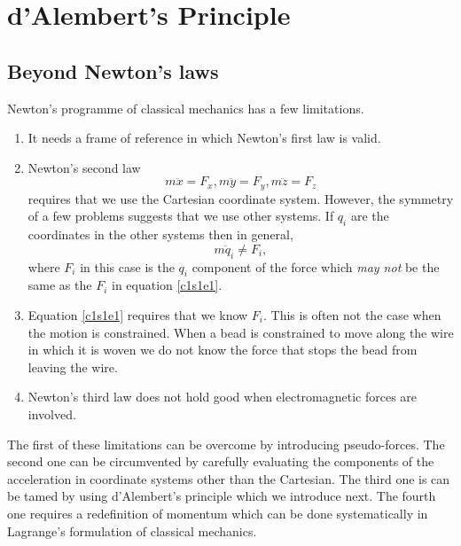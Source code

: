 \chapter{d'Alembert's Principle}\label{c1}
\section{Beyond Newton's laws}\label{c1s1}
Newton's programme of classical mechanics has a few limitations.
\begin{enumerate}
\item It needs a frame of reference in which Newton's first law is valid.
\item Newton's second law
\begin{equation}\label{c1s1e1}
m\ddot{x} = F_x, m\ddot{y} = F_y, m\ddot{z} = F_z
\end{equation}
requires that we use the Cartesian coordinate system. However, the symmetry of
a few problems suggests that we use other systems. If $q_i$ are the coordinates
in the other systems then in general,
\begin{equation}\label{c1s1e2}
m\ddot{q}_i \ne F_i,
\end{equation}
where $F_i$ in this case is the $q_i$ component of the force which \emph{may
not} be the same as the $F_i$ in equation \eqref{c1s1e1}.
\item Equation \eqref{c1s1e1} requires that we know $F_i$. This is often not the
case when the motion is constrained. When a bead is constrained to move along
the wire in which it is woven we do not know the force that stops the bead
from leaving the wire.
\item Newton's third law does not hold good when electromagnetic forces are
involved.
\end{enumerate}

The first of these limitations can be overcome by introducing pseudo-forces.
The second one can be circumvented by carefully evaluating the components of
the acceleration in coordinate systems other than the Cartesian. The third one
is can be tamed by using d'Alembert's principle which we introduce next. The
fourth one requires a redefinition of momentum which can be done systematically
in Lagrange's formulation of classical mechanics.

